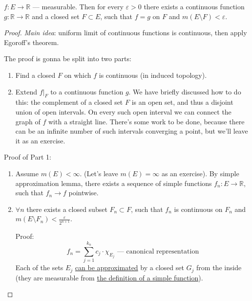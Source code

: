 \begin{theorem}
    $f : E \to \mathbb{R}$ --- measurable. Then for every
    $\varepsilon > 0$ there exists a continuous function
    $g : \mathbb{R} \to \mathbb{R}$ and a closed set $F \subset E$, 
    such that $f = g$ on $F$ and $m(E \setminus F) < \varepsilon$.
\end{theorem}
\begin{proof}
    \textit{Main idea}: uniform limit of continuous functions is continuous,
    then apply Egoroff's theorem.

    The proof is gonna be split into two parts:
    \begin{enumerate}
        \item {
            Find a closed $F$ on which $f$ is continuous (in induced topology).
        }
        \item {
            Extend $f|_F$ to a continuous function $g$.
            We have briefly discussed how to do this:
            the complement of a closed set $F$ is an open set, 
            and thus a disjoint union of open intervals. On every such
            open interval we can connect the graph of $f$
            with a straight line. There's some work to be done, because
            there can be an infinite number of such intervals converging a point,
            but we'll leave it as an exercise.
        }
    \end{enumerate}

    Proof of Part 1:
    \begin{enumerate}
        \item {
            Assume $m(E) < \infty$. (Let's leave $m(E) = \infty$
            as an exercise).
            By simple approximation lemma, there exists a sequence of 
            simple functions $f_n : E \to \mathbb{R}$, such that
            $f_n \to f$ pointwise.
        }
        \item {
            $\forall n$ there exists a closed subset $F_n \subset F$,
            such that $f_n$ is continuous on $F_n$ and
            $m(E \setminus F_n) < \frac{\varepsilon}{2^{n+1}}$.
            
            Proof:
            \[ f_n = \sum_{j=1}^{k_n} c_j \cdot \chi_{E_j} \text{ --- canonical representation} \]
            Each of the sets $E_j$ 
            \hyperref[the:lebesgueMeasurableConditions]{can be approximated}
            by a closed set $G_j$ from the inside (they are measurable from
            \hyperref[def:simpleFunction]{the definition of a simple function}).

}
\end{enumerate}
\end{proof}
